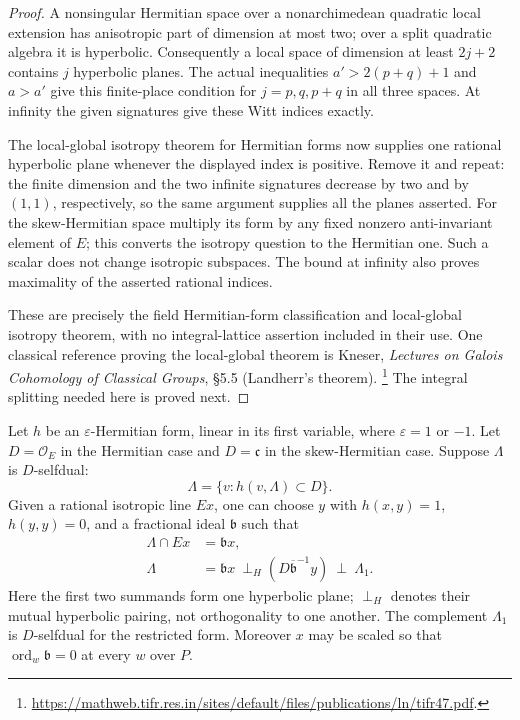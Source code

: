 \begin{proof}
A nonsingular Hermitian space over a nonarchimedean quadratic
local extension has anisotropic part of dimension at most two;
over a split quadratic algebra it is hyperbolic.
Consequently a local space of dimension at least \(2j+2\)
contains \(j\) hyperbolic planes. The actual inequalities
\(a'>2(p+q)+1\) and \(a>a'\) give this finite-place condition
for \(j=p,q,p+q\) in all three spaces.
At infinity the given signatures give these Witt indices exactly.

The local-global isotropy theorem for Hermitian forms now supplies
one rational hyperbolic plane whenever the displayed index is
positive. Remove it and repeat: the finite dimension and the
two infinite signatures decrease by two and by \((1,1)\),
respectively, so the same argument supplies all the planes asserted.
For the skew-Hermitian space multiply its form by any fixed nonzero
anti-invariant element of \(E\); this converts the isotropy question
to the Hermitian one. Such a scalar does not change isotropic
subspaces. The bound at infinity also proves maximality of
the asserted rational indices.

These are precisely the field Hermitian-form classification and
local-global isotropy theorem, with no integral-lattice assertion
included in their use. One classical reference proving the
local-global theorem is Kneser, \emph{Lectures on Galois Cohomology
of Classical Groups}, \S5.5 (Landherr's theorem).
\footnote{\url{https://mathweb.tifr.res.in/sites/default/files/publications/ln/tifr47.pdf}.}
The integral splitting needed here is proved next.
\end{proof}

\begin{srlemma}
\label{lem:sr-theta-integral-plane}
Let \(h\) be an \(\varepsilon\)-Hermitian form, linear in its first
variable, where \(\varepsilon=1\) or \(-1\).
Let \(D=\mathcal O_E\) in the Hermitian case and \(D=\mathfrak c\)
in the skew-Hermitian case. Suppose \(\Lambda\) is \(D\)-selfdual:
\[
 \Lambda=\{v:h(v,\Lambda)\subset D\}.
\]
Given a rational isotropic line \(Ex\), one can choose \(y\) with
\(h(x,y)=1\), \(h(y,y)=0\), and a fractional ideal \(\mathfrak b\)
such that
\[
 \begin{split}
  \Lambda\cap Ex&=\mathfrak b x,\\
  \Lambda&=\mathfrak b x\ \mathbin{\perp_{\!H}}\!
     (D\overline{\mathfrak b}^{-1}y)\ \perp\ \Lambda_1.
 \end{split}                                      \tag{M1}
 \label{eq:sr-adapted-lattice-plane}
\]
Here the first two summands form one hyperbolic plane;
\(\perp_H\) denotes their mutual hyperbolic pairing, not
orthogonality to one another. The complement \(\Lambda_1\)
is \(D\)-selfdual for the restricted form.
Moreover \(x\) may be scaled so that
\(\operatorname{ord}_w\mathfrak b=0\) at every \(w\) over \(P\).
\end{srlemma}

